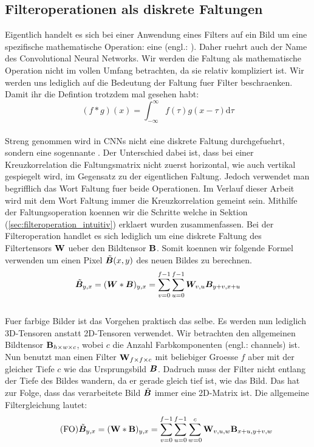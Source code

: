 \subsection{Filteroperationen als diskrete Faltungen}
Eigentlich handelt es sich bei einer Anwendung eines Filters auf ein Bild um
eine spezifische mathematische Operation: eine  (engl.:
).
Daher ruehrt auch der Name des Convolutional Neural Networks.
Wir werden die Faltung als mathematische Operation nicht im vollen Umfang
betrachten, da sie relativ kompliziert ist. Wir werden uns lediglich auf die
Bedeutung der Faltung fuer Filter beschraenken.
Damit ihr die Defintion trotzdem mal gesehen habt:
\\
\begin{equation}
  (f * g)(x) = \int_{-\infty}^{\infty} f(\tau) g(x-\tau) \text{d}\tau
\end{equation}
\\
Streng genommen wird in CNNs nicht eine diskrete Faltung durchgefuehrt, sondern
eine sogennante . Der Unterschied dabei ist, dass bei einer
Kreuzkorrelation die Faltungsmatrix nicht zuerst horizontal, wie auch vertikal
gespiegelt wird, im Gegensatz zu der eigentlichen Faltung. Jedoch verwendet man
begrifflich das Wort Faltung fuer beide Operationen. Im Verlauf dieser Arbeit
wird mit dem Wort Faltung immer die Kreuzkorrelation gemeint sein.
\para{}
Mithilfe der Faltungsoperation koennen wir die Schritte welche in Sektion
(\ref{sec:filteroperation_intuitiv}) erklaert wurden zusammenfassen.
Bei der Filteroperation handlet es sich lediglich um eine diskrete Faltung des
Filtertensors $\mathbf{W}$ ueber den Bildtensor $\mathbf{B}$. Somit koennen wir
folgende Formel verwenden um einen Pixel $\tilde{\bm{B}}(x,y)$ des neuen Bildes zu berechnen.
\\
\begin{equation}
  \tilde{\bm{B}}_{y,x} = (\bm{W} * \bm{B})_{y,x} = \sum_{v=0}^{f-1} \sum_{u=0}^{f-1} \bm{W}_{v,u}\bm{B}_{y+v,x+u}
\end{equation}
\\
Fuer farbige Bilder ist das Vorgehen praktisch das selbe. Es werden nun
lediglich 3D-Tensoren anstatt 2D-Tensoren verwendet. Wir betrachten den
allgemeinen Bildtensor $\mathbf{B}_{h \times w \times c}$, wobei $c$ die Anzahl
Farbkomponenten (engl.: channels) ist.
Nun benutzt man einen Filter $\mathbf{W}_{f \times f \times c}$ mit beliebiger Groesse
$f$ aber mit der gleicher Tiefe $c$ wie das Ursprungsbild $\bm{B}$.
Dadruch muss der Filter nicht entlang der Tiefe des Bildes wandern, da er
gerade gleich tief ist, wie das Bild. Das hat zur Folge, dass das verarbeitete
Bild $\tilde{\bm{B}}$ immer eine 2D-Matrix ist.
Die allgemeine Filtergleichung lautet:
\\
\begin{equation}\tag{FO}
  \tilde{\bm{B}}_{y,x} = (\mathbf{W} * \mathbf{B})_{y,x} = \sum_{v=0}^{f-1} \sum_{u=0}^{f-1} \sum_{w=0}^c \mathbf{W}_{v,u,w} \mathbf{B}_{x+u,y+v,w}
\end{equation}

